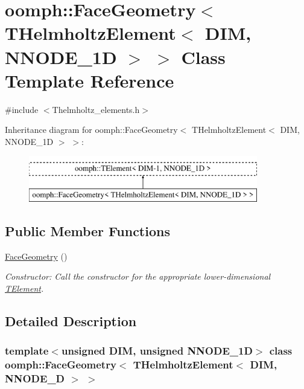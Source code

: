 \hypertarget{classoomph_1_1FaceGeometry_3_01THelmholtzElement_3_01DIM_00_01NNODE__1D_01_4_01_4}{}\section{oomph\+:\+:Face\+Geometry$<$ T\+Helmholtz\+Element$<$ D\+IM, N\+N\+O\+D\+E\+\_\+1D $>$ $>$ Class Template Reference}
\label{classoomph_1_1FaceGeometry_3_01THelmholtzElement_3_01DIM_00_01NNODE__1D_01_4_01_4}


{\ttfamily \#include $<$Thelmholtz\+\_\+elements.\+h$>$}

Inheritance diagram for oomph\+:\+:Face\+Geometry$<$ T\+Helmholtz\+Element$<$ D\+IM, N\+N\+O\+D\+E\+\_\+1D $>$ $>$\+:\begin{figure}[H]
\begin{center}
\leavevmode
\includegraphics[height=2.000000cm]{classoomph_1_1FaceGeometry_3_01THelmholtzElement_3_01DIM_00_01NNODE__1D_01_4_01_4}
\end{center}
\end{figure}
\subsection*{Public Member Functions}
\begin{DoxyCompactItemize}
\item 
\hyperlink{classoomph_1_1FaceGeometry_3_01THelmholtzElement_3_01DIM_00_01NNODE__1D_01_4_01_4_a6d4d6ea22279cc5b7e16dbbb2036ebb3}{Face\+Geometry} ()
\begin{DoxyCompactList}\small\item\em Constructor\+: Call the constructor for the appropriate lower-\/dimensional \hyperlink{classoomph_1_1TElement}{T\+Element}. \end{DoxyCompactList}\end{DoxyCompactItemize}


\subsection{Detailed Description}
\subsubsection*{template$<$unsigned D\+IM, unsigned N\+N\+O\+D\+E\+\_\+1D$>$\newline
class oomph\+::\+Face\+Geometry$<$ T\+Helmholtz\+Element$<$ D\+I\+M, N\+N\+O\+D\+E\+\_\+D $>$ $>$}


